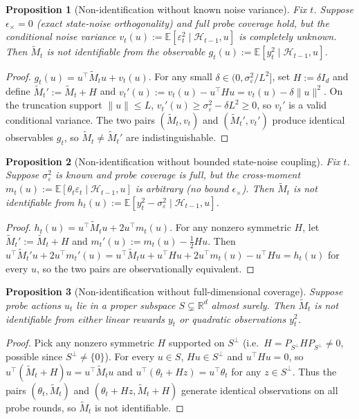 \documentclass{article}
\newcommand{\R}{\mathbb{R}}
\newcommand{\E}{\mathbb{E}}
\newcommand{\cH}{\mathcal{H}}
\newtheorem{proposition}{Proposition}
\begin{document}
\begin{proposition}[Non-identification without known noise variance]
\label{prop:nonid_a}
Fix $t$. Suppose $\epsilon_\times=0$ (exact state-noise orthogonality)
and full probe coverage hold, but the conditional noise variance
$v_t(u):=\E[\varepsilon_t^2\mid\cH_{t-1},u]$ is completely unknown.
Then $\widetilde M_t$ is not identifiable from the observable
$g_t(u):=\E[y_t^2\mid\cH_{t-1},u]$.
\end{proposition}
\begin{proof}
$g_t(u) = u^\top\widetilde M_t u + v_t(u)$. For any small
$\delta\in(0,\sigma_\varepsilon^2/L^2]$, set $H:=\delta I_d$ and
define $\widetilde M_t':=\widetilde M_t + H$ and
$v_t'(u):=v_t(u) - u^\top H u = v_t(u)-\delta\|u\|^2$. On the
truncation support $\|u\|\le L$, $v_t'(u)\ge \sigma_\varepsilon^2 -
\delta L^2\ge 0$, so $v_t'$ is a valid conditional variance. The two
pairs $(\widetilde M_t,v_t)$ and $(\widetilde M_t',v_t')$ produce
identical observables $g_t$, so $\widetilde M_t\ne\widetilde M_t'$
are indistinguishable.
\end{proof}

\begin{proposition}[Non-identification without bounded state-noise coupling]
\label{prop:nonid_b}
Fix $t$. Suppose $\sigma_\varepsilon^2$ is known and probe coverage is
full, but the cross-moment
$m_t(u):=\E[\theta_t\varepsilon_t\mid\cH_{t-1},u]$ is arbitrary (no
bound $\epsilon_\times$). Then $\widetilde M_t$ is not identifiable
from $h_t(u):=\E[y_t^2-\sigma_\varepsilon^2\mid\cH_{t-1},u]$.
\end{proposition}
\begin{proof}
$h_t(u) = u^\top\widetilde M_t u + 2 u^\top m_t(u)$. For any nonzero
symmetric $H$, let $\widetilde M_t':=\widetilde M_t + H$ and
$m_t'(u):=m_t(u) - \tfrac{1}{2}Hu$. Then
$u^\top\widetilde M_t' u + 2 u^\top m_t'(u)
= u^\top\widetilde M_t u + u^\top H u + 2 u^\top m_t(u) - u^\top H u
= h_t(u)$ for every $u$, so the two pairs are observationally
equivalent.
\end{proof}

\begin{proposition}[Non-identification without full-dimensional coverage]
\label{prop:nonid_c}
Suppose probe actions $u_t$ lie in a proper subspace $S\subsetneq\R^d$
almost surely. Then $\widetilde M_t$ is not identifiable from either
linear rewards $y_t$ or quadratic observations $y_t^2$.
\end{proposition}
\begin{proof}
Pick any nonzero symmetric $H$ supported on $S^\perp$ (i.e.\
$H = P_{S^\perp} H P_{S^\perp}\ne 0$, possible since
$S^\perp\ne\{0\}$). For every $u\in S$, $Hu\in S^\perp$ and $u^\top H u=0$,
so $u^\top(\widetilde M_t + H)u = u^\top\widetilde M_t u$ and
$u^\top(\theta_t + Hz)=u^\top\theta_t$ for any $z\in S^\perp$. Thus the
pairs $(\theta_t,\widetilde M_t)$ and $(\theta_t+Hz,\widetilde M_t+H)$
generate identical observations on all probe rounds, so $\widetilde M_t$
is not identifiable.
\end{proof}
\end{document}
